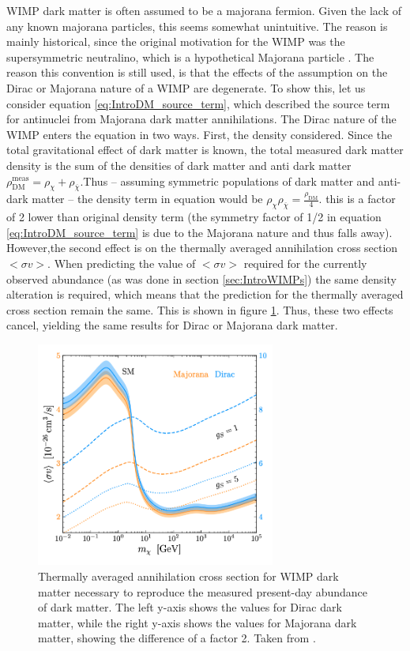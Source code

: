 WIMP dark matter is often assumed to be a majorana fermion. Given the lack of any known majorana particles, this seems somewhat unintuitive. The reason is mainly historical, since the original motivation for the WIMP was the supersymmetric neutralino, which is a hypothetical Majorana particle \cite{Supersymmetry_primer}. The reason this convention is still used, is that the effects of the assumption on the Dirac or Majorana nature of a WIMP are degenerate. To show this, let us consider equation \ref{eq:IntroDM_source_term}, which described the source term for antinuclei from Majorana dark matter annihilations. The Dirac nature of the WIMP enters the equation in two ways. First, the density considered. Since the total gravitational effect of dark matter is known, the total measured dark matter density is the sum of the densities of dark matter and anti dark matter $\rho_{\mathrm{DM}}^{\mathrm{meas}} = \rho_\chi  + \rho_{\overline{\chi}}$.Thus -- assuming symmetric populations of dark matter and anti-dark matter -- the density term in equation would be $\rho_\chi \rho_{\overline{\chi}} = \frac{\rho_{\mathrm{DM}}}{4}$. this is a factor of 2 lower than original density term (the symmetry factor of 1/2 in equation \ref{eq:IntroDM_source_term} is due to the Majorana nature and thus falls away). However,the second effect is on the thermally averaged annihilation cross section $<\sigma v>$. When predicting the value of $<\sigma v>$ required for the currently observed abundance (as was done in section \ref{sec:IntroWIMPs}) the same density alteration is required, which means that the prediction for the thermally averaged cross section remain the same. This is shown in figure \ref{fig:sigmaV_DiracvsMajorana}. Thus, these two effects cancel, yielding the same results for Dirac or Majorana dark matter. \\

\begin{figure}[h!]
    \centering
    \includegraphics[width=0.7\textwidth]{figures/sigma_v_dirac_majorana_dm.png}
    \caption{Thermally averaged annihilation cross section for WIMP dark matter necessary to reproduce the measured present-day abundance of dark matter. The left y-axis shows the values for Dirac dark matter, while the right y-axis shows the values for Majorana dark matter, showing the difference of a factor 2. Taken from \cite{}. }
    \label{fig:sigmaV_DiracvsMajorana}
\end{figure}

